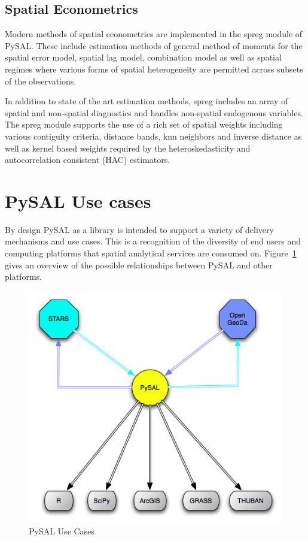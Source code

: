 \documentclass[11pt, titlepage]{article}
\begin{document}
\subsection{Spatial Econometrics}

Modern methods of spatial econometrics are implemented in the spreg
module of PySAL. These include estimation methods of general method of
moments for the spatial error model, spatial lag model, combination
model as well as spatial regimes where various forms of spatial
heterogeneity are permitted across subsets of the observations.

In addition to state of the art estimation methods, spreg includes an
array of spatial and non-spatial diagnostics and handles non-spatial
endogenous variables. The spreg module supports the use of a rich set of
spatial weights including various contiguity criteria, distance bands,
knn neighbors and inverse distance as well as kernel based weights
required by the heteroskedasticity and autocorrelation consistent (HAC)
estimators.

\section{PySAL Use cases}

By design PySAL as a library is intended to support a variety of
delivery mechanisms and use cases. This is a recognition of the
diversity of end users and computing platforms that spatial analytical
services are consumed on. Figure~\ref{f:use} gives an overview of the
possible relationships between PySAL and other platforms.

\begin{figure}[ht]
\begin{center}
\includegraphics[width=\linewidth]{pysal_applications.png}
\end{center}
\caption{PySAL Use Cases}
\label{f:use}
\end{figure}   
\end{document}
